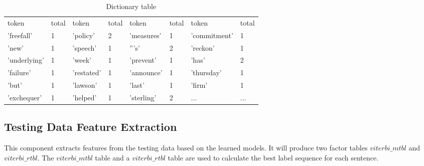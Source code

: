 \begin {table}[h]
\caption {Dictionary table} \label{tab:title}
\begin{center}
    \scriptsize
    \begin{tabular}{ | l | l || l | l || l | l || l | l | }
    \hline
    token     & total & token   & total & token     & total & token       & total\\
    'freefall'& 1     & 'policy'& 2     & 'measures'&1      & 'commitment'&1\\
    'new'&1& 'speech'&1& '''s'&2& 'reckon'&1\\
    'underlying'&1&'week'&1& 'prevent'&1& 'has'&2\\
    'failure'&1& 'restated'&1&'announce'&1& 'thursday'&1\\
    'but'&1& 'lawson'&1& 'last'&1& 'firm'&1\\
    'exchequer'&1& 'helped'&1& 'sterling'&2& $\ldots$ & $\ldots$\\
    \hline
    \end{tabular}
\end{center}
\end {table}


\subsection{Testing Data Feature Extraction}
  This component extracts features from the testing data based on the learned models.
  It will produce two factor tables
  $viterbi\_mtbl$ and  $viterbi\_rtbl$. The $viterbi\_mtbl$
  table and a $viterbi\_rtbl$ table are used to calculate the best label
  sequence for each sentence.

